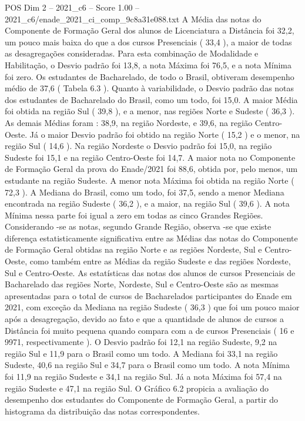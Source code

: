 \begin{textsample}{POS Dim 2 – 2021\_c6 – Score 1.00 – 2021\_c6/enade\_2021\_ci\_comp\_9c8a31e088.txt}
A Média das notas do Componente de Formação Geral dos alunos de Licenciatura a Distância foi 32,2, um pouco mais baixa do que a dos cursos Presenciais ( 33,4 ), a maior de todas as desagregações consideradas.
Para esta combinação de Modalidade e Habilitação, o Desvio padrão foi 13,8, a nota Máxima foi 76,5, e a nota Mínima foi zero.
Os estudantes de Bacharelado, de todo o Brasil, obtiveram desempenho médio de 37,6 ( Tabela 6.3 ).
Quanto à variabilidade, o Desvio padrão das notas dos estudantes de Bacharelado do Brasil, como um todo, foi 15,0.
A maior Média foi obtida na região Sul ( 39,8 ), e a menor, nas regiões Norte e Sudeste ( 36,3 ).
As demais Médias foram : 38,9, na região Nordeste, e 39,6, na região Centro-Oeste.
Já o maior Desvio padrão foi obtido na região Norte ( 15,2 ) e o menor, na região Sul ( 14,6 ).
Na região Nordeste o Desvio padrão foi 15,0, na região Sudeste foi 15,1 e na região Centro-Oeste foi 14,7.
A maior nota no Componente de Formação Geral da prova do Enade/2021 foi 88,6, obtida por, pelo menos, um estudante na região Sudeste.
A menor nota Máxima foi obtida na região Norte ( 72,3 ).
A Mediana do Brasil, como um todo, foi 37,5, sendo a menor Mediana encontrada na região Sudeste ( 36,2 ), e a maior, na região Sul ( 39,6 ).
A nota Mínima nessa parte foi igual a zero em todas as cinco Grandes Regiões.
Considerando -se as notas, segundo Grande Região, observa -se que existe diferença estatisticamente significativa entre as Médias das notas do Componente de Formação Geral obtidas na região Norte e as regiões Nordeste, Sul e Centro-Oeste, como também entre as Médias da região Sudeste e das regiões Nordeste, Sul e Centro-Oeste.
As estatísticas das notas dos alunos de cursos Presenciais de Bacharelado das regiões Norte, Nordeste, Sul e Centro-Oeste são as mesmas apresentadas para o total de cursos de Bacharelados participantes do Enade em 2021, com exceção da Mediana na região Sudeste ( 36,3 ) que foi um pouco maior após a desagregação, devido ao fato e que a quantidade de alunos de cursos a Distância foi muito pequena quando compara com a de cursos Presenciais ( 16 e 9971, respectivamente ).
O Desvio padrão foi 12,1 na região Sudeste, 9,2 na região Sul e 11,9 para o Brasil como um todo.
A Mediana foi 33,1 na região Sudeste, 40,6 na região Sul e 34,7 para o Brasil como um todo.
A nota Mínima foi 11,9 na região Sudeste e 34,1 na região Sul.
Já a nota Máxima foi 57,4 na região Sudeste e 47,1 na região Sul.
O Gráfico 6.2 propicia a avaliação do desempenho dos estudantes do Componente de Formação Geral, a partir do histograma da distribuição das notas correspondentes.

\end{textsample}
